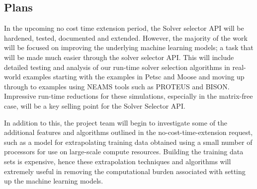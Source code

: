 \subsection{Plans}
In the upcoming no cost time extension period, the Solver selector API will be hardened, tested, documented and extended. However, the majority of the work will be focused on improving the underlying machine learning models; a task that will be made much easier through the solver selector API. This will include detailed testing and analysis of our run-time solver selection algorithms in real-world examples starting with the examples in Petsc and Moose and moving up through to examples using NEAMS tools such as PROTEUS and BISON. Impressive run-time reductions for these simulations, especially in the matrix-free case, will be a key selling point for the Solver Selector API. 

In addition to this, the project team will begin to investigate some of the additional features and algorithms outlined in the no-cost-time-extension request, such as a model for extrapolating training data obtained using a small number of processors for use on large-scale compute resources. Building the training data sets is expensive, hence these extrapolation techniques and algorithms will extremely useful in removing the computational burden associated with setting up the machine learning models. 

